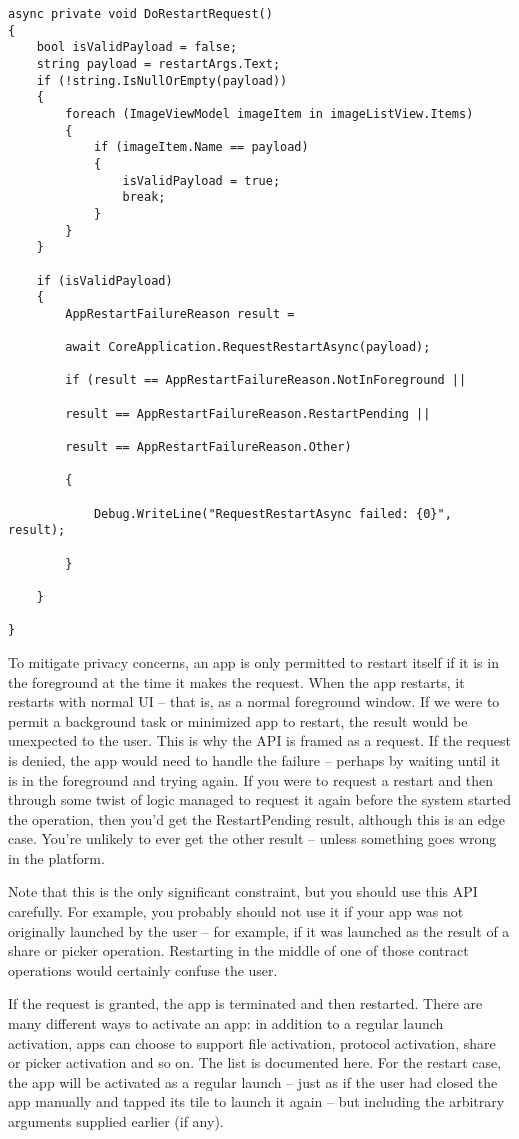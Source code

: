 \begin{lstlisting}[style=CSharpStyle]
async private void DoRestartRequest()
{
	bool isValidPayload = false;
	string payload = restartArgs.Text;
	if (!string.IsNullOrEmpty(payload))
	{
		foreach (ImageViewModel imageItem in imageListView.Items)
		{
			if (imageItem.Name == payload)
			{
				isValidPayload = true;
				break;
			}
		}
	}
	
	if (isValidPayload)
	{
		AppRestartFailureReason result =
		
		await CoreApplication.RequestRestartAsync(payload);
		
		if (result == AppRestartFailureReason.NotInForeground ||
		
		result == AppRestartFailureReason.RestartPending ||
		
		result == AppRestartFailureReason.Other)
		
		{
			
			Debug.WriteLine("RequestRestartAsync failed: {0}", result);
			
		}
		
	}
	
}
\end{lstlisting}


To mitigate privacy concerns, an app is only permitted to restart itself if it is in the foreground at the time it makes the request. When the app restarts, it restarts with normal UI – that is, as a normal foreground window. If we were to permit a background task or minimized app to restart, the result would be unexpected to the user. This is why the API is framed as a request. If the request is denied, the app would need to handle the failure – perhaps by waiting until it is in the foreground and trying again. If you were to request a restart and then through some twist of logic managed to request it again before the system started the operation, then you’d get the RestartPending result, although this is an edge case. You’re unlikely to ever get the other result – unless something goes wrong in the platform.

Note that this is the only significant constraint, but you should use this API carefully. For example, you probably should not use it if your app was not originally launched by the user – for example, if it was launched as the result of a share or picker operation. Restarting in the middle of one of those contract operations would certainly confuse the user.

If the request is granted, the app is terminated and then restarted. There are many different ways to activate an app: in addition to a regular launch activation, apps can choose to support file activation, protocol activation, share or picker activation and so on. The list is documented here. For the restart case, the app will be activated as a regular launch – just as if the user had closed the app manually and tapped its tile to launch it again – but including the arbitrary arguments supplied earlier (if any).

